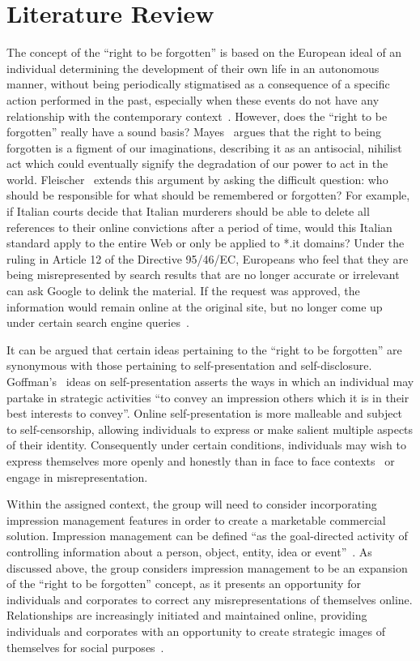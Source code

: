 \section{Literature Review}

The concept of the ``right to be forgotten'' is based on the European ideal of an individual determining the development of their own life in an autonomous manner, without being periodically stigmatised as a consequence of a specific action performed in the past, especially when these events do not have any relationship with the contemporary context~\parencite{art:eu_forgotten}. However, does the ``right to be forgotten'' really have a sound basis? Mayes~\parencite{web:no_right_forgotten} argues that the right to being forgotten is a figment of our imaginations, describing it as an antisocial, nihilist act which could eventually signify the degradation of our power to act in the world. Fleischer~\parencite{web:foggy_thinking} extends this argument by asking the difficult question: who should be responsible for what should be remembered or forgotten? For example, if Italian courts decide that Italian murderers should be able to delete all references to their online convictions after a period of time, would this Italian standard apply to the entire Web or only be applied to *.it domains? Under the ruling in Article 12 of the Directive 95/46/EC, Europeans who feel that they are being misrepresented by search results that are no longer accurate or irrelevant can ask Google to delink the material. If the request was approved, the information would remain online at the original site, but no longer come up under certain search engine queries~\parencite{web:right_to_be_forgotten}. 

It can be argued that certain ideas pertaining to the ``right to be forgotten'' are synonymous with those pertaining to self-presentation and self-disclosure. Goffman's~\parencite{book:self_presentation} ideas on self-presentation asserts the ways in which an individual may partake in strategic activities ``to convey an impression others which it is in their best interests to convey''. Online self-presentation is more malleable and subject to self-censorship, allowing individuals to express or make salient multiple aspects of their identity. Consequently under certain conditions, individuals may wish to express themselves more openly and honestly than in face to face contexts~\parencite{art:manage_impress} or engage in misrepresentation.

Within the assigned context, the group will need to consider incorporating impression management features in order to create a marketable commercial solution. Impression management can be defined ``as the goal-directed activity of controlling information about a person, object, entity, idea or event''~\parencite{art:appearing_competent}. As discussed above, the group considers impression management to be an expansion of the ``right to be forgotten'' concept, as it presents an opportunity for individuals and corporates to correct any misrepresentations of themselves online. Relationships are increasingly initiated and maintained online, providing individuals and corporates with an opportunity to create strategic images of themselves for social purposes~\parencite{art:olm}.

